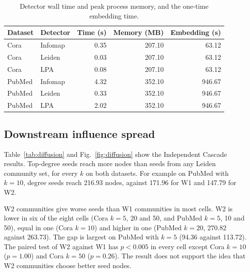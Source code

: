 \begin{table}[!t]
\centering
\caption{Detector wall time and peak process memory, and the one-time embedding time.}
\label{tab:runtime}
\footnotesize
\begin{tabular}{@{}llrrr@{}}
\toprule
Dataset & Detector & Time (s) & Memory (MB) & Embedding (s) \\
\midrule
Cora & Infomap & 0.35 & 207.10 & 63.12 \\
Cora & Leiden & 0.03 & 207.10 & 63.12 \\
Cora & LPA & 0.08 & 207.10 & 63.12 \\
PubMed & Infomap & 4.32 & 352.10 & 946.67 \\
PubMed & Leiden & 0.33 & 352.10 & 946.67 \\
PubMed & LPA & 2.02 & 352.10 & 946.67 \\
\bottomrule
\end{tabular}
\end{table}

\subsection{Downstream influence spread}
Table~\ref{tab:diffusion} and Fig.~\ref{fig:diffusion} show the Independent Cascade results. Top-degree seeds reach more nodes than seeds from any Leiden community set, for every $k$ on both datasets. For example on PubMed with $k=10$, degree seeds reach 216.93 nodes, against 171.96 for W1 and 147.79 for W2.

W2 communities give worse seeds than W1 communities in most cells. W2 is lower in six of the eight cells (Cora $k=5$, 20 and 50, and PubMed $k=5$, 10 and 50), equal in one (Cora $k=10$) and higher in one (PubMed $k=20$, 270.82 against 263.73). The gap is largest on PubMed with $k=5$ (94.36 against 113.72). The paired test of W2 against W1 has $p<0.005$ in every cell except Cora $k=10$ ($p=1.00$) and Cora $k=50$ ($p=0.26$). The result does not support the idea that W2 communities choose better seed nodes.

